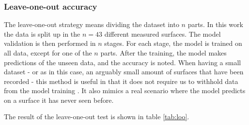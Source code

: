\subsubsection{Leave-one-out accuracy}
The leave-one-out strategy means dividing the dataset into $n$ parts. In this work the data is split up in the $n=43$ different measured surfaces. The model validation is then performed in $n$ stages. For each stage, the model is trained on all data, except for one of the $n$ parts. After the training, the model makes predictions of the unseen data, and the accuracy is noted. When having a small dataset - or as in this case, an arguably small amount of surfaces that have been recorded - this method is useful in that it does not require us to withhold data from the model training \citep{raschka}. It also mimics a real scenario where the model predicts on a surface it has never seen before.

The result of the leave-one-out test is shown in table \ref{tab:loo}.










